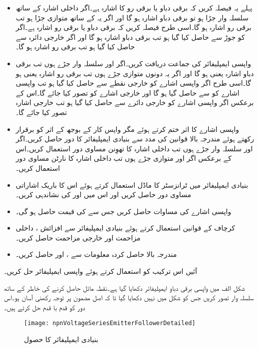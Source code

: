 \begin{itemize}
\item
پہلے یہ فیصلہ کریں کہ  برقی دباو یا برقی رو کا اشارہ ہے۔اگر  داخلی اشارہ  کے ساتھ سلسلہ وار جڑا ہو تو  برقی دباو اشارہ ہو گا اور اگر یہ  کے ساتھ متوازی جڑا ہو تب  برقی رو اشارہ ہو گا۔اسی طرح فیصلہ کریں کہ  برقی دباو یا برقی رو اشارہ ہے۔اگر  کو  جوڑ سے حاصل کیا گیا ہو تب  برقی دباو اشارہ ہو گا اور اگر  خارجی دائرہ سے حاصل کیا گیا ہو تب  برقی رو اشارہ ہو گا۔
\item
واپسی ایمپلیفائر کی جماعت دریافت کریں۔اگر  اور  سلسلہ وار جڑے ہوں تب  برقی دباو اشارہ یعنی  ہو گا اور اگر یہ دونوں متوازی جڑے ہوں تب  برقی رو اشارہ یعنی  ہو گا۔اسی طرح اگر واپسی اشارے کو خارجی نقطے  سے حاصل کیا گیا ہو تب واپسی اشارے کو  سے حاصل گیا ہو گا اور خارجی اشارے کو  تصور کیا جائے گا۔اس کے برعکس اگر واپسی اشارے کو خارجی دائرے سے حاصل کیا گیا ہو تب خارجی اشارہ  تصور کیا جائے گا۔
\item 
واپسی اشارے کا اثر ختم کرتے ہوئے مگر واپس کار کے بوجھ کے اثر کو برقرار رکھتے ہوئے مندرجہ بالا قوانین کی مدد سے بنیادی ایمپلیفائر کا دور حاصل کریں۔اگر  اور  سلسلہ وار جڑے ہوں تب داخلی اشارہ  کا تھوِنن  مساوی دور استعمال کریں۔اس کے برعکس اگر  اور  متوازی جڑے ہوں تب داخلی اشارہ  کا نارٹن مساوی دور استعمال کریں۔
\item
بنیادی ایمپلیفائر میں ٹرانزسٹر کا ماڈل استعمال کرتے ہوئے اس کا باریک اشاراتی مساوی دور حاصل کریں اور اس میں  اور  کی نشاندہی کریں۔
\item
واپسی اشارے  کی مساوات حاصل کریں جس سے  کی قیمت حاصل ہو گی۔
\item
کرچاف کے قوانین استعمال کرتے ہوئے بنیادی ایمپلیفائر سے افزائش ، داخلی مزاحمت  اور خارجی مزاحمت  حاصل کریں۔
\item
مندرجہ بالا حاصل کردہ معلومات سے ،  اور  حاصل کریں۔
\end{itemize}

آئیں اس ترکیب کو استعمال کرتے ہوئے واپسی ایمپلیفائر حل کریں۔

شکل  الف میں واپسی برقی دباو ایمپلیفائر دکھایا گیا ہے۔نقطہ مائل حاصل کرنے کی خاطر  کے ساتھ  سلسلہ وار تصور کریں جس کو شکل میں نہیں دکھایا گیا تا کہ اصل مضمون پر توجہ رکھنی آسان ہو۔اس دور کو قدم با قدم حل کرتے ہیں۔
\begin{figure}
\centering
\texttt{[image: npnVoltageSeriesEmitterFollowerDetailed]}
\caption{بنیادی ایمپلیفائر کا حصول}
\label{شکل_واپسی_بنیادی_ایمپلیفائر_کا_حصول}
\end{figure}

